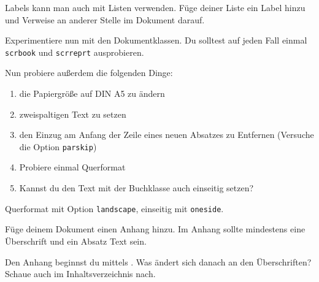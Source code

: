 \begin{uebung}
    
\item Labels kann man auch mit Listen verwenden. Füge deiner Liste ein Label
    hinzu und Verweise an anderer Stelle im Dokument darauf. \label{layout:first}

\item Experimentiere nun mit den Dokumentklassen. Du solltest auf jeden
    Fall einmal \texttt{scrbook} und \texttt{scrreprt} ausprobieren.
    
    Nun probiere außerdem die folgenden Dinge:
    \begin{enumerate}
        \item die Papiergröße auf DIN A5 zu ändern
        \item zweispaltigen Text zu setzen
        \item den Einzug am Anfang der Zeile eines neuen Absatzes zu
            Entfernen (Versuche die Option \texttt{parskip})
        \item Probiere einmal Querformat
        \item Kannst du den Text mit der Buchklasse auch einseitig setzen?
    \end{enumerate}
    \begin{loesung}
        Querformat mit Option \texttt{landscape}, einseitig mit \texttt{oneside}.
    \end{loesung}

\item Füge deinem Dokument einen Anhang hinzu. Im Anhang sollte mindestens
    eine Überschrift und ein Absatz Text sein.
    \begin{hinweis}
        Den Anhang beginnst du mittels . Was ändert sich
        danach an den Überschriften? Schaue auch im Inhaltsverzeichnis nach.
    \end{hinweis}

\label{layout:last}
\label{markuplayout:last}

\end{uebung}